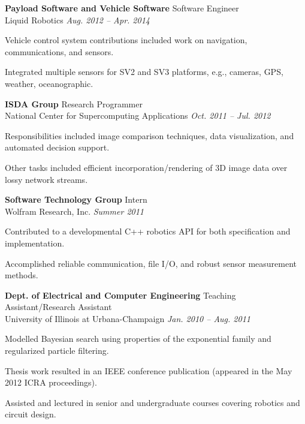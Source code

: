 \documentclass[article]{resume}
\begin{document}
{    \textbf{Payload Software and Vehicle Software} \hfill Software Engineer\\  
    Liquid Robotics \hfill \textsl{Aug. 2012 -- Apr. 2014} \\
    \vspace{ -2 mm}
    \begin{list2}
        \item Vehicle control system contributions included work on navigation, communications, and sensors.
        \item Integrated multiple sensors for SV2 and SV3 platforms, e.g., cameras, GPS, weather, oceanographic.
    \end{list2}\vspace{-2mm}

    \textbf{ISDA Group} \hfill Research Programmer\\  
    National Center for Supercomputing Applications \hfill \textsl{Oct. 2011 -- Jul. 2012} \\
    \vspace{ -2 mm}
    \begin{list2}
        \item Responsibilities included image comparison techniques, data visualization, and automated decision support. 
        \item Other tasks included efficient incorporation/rendering of 3D image data over lossy network streams.  
    \end{list2}\vspace{-2mm}
   
    \textbf{Software Technology Group} \hfill Intern\\  
    Wolfram Research, Inc. \hfill \textsl{Summer 2011} \\
    \vspace{ -2 mm}
    \begin{list2}
        \item Contributed to a developmental C++ robotics API for both specification and implementation.
	 \item Accomplished reliable communication, file I/O, and robust sensor measurement methods. 
    \end{list2}\vspace{-2mm}

    \textbf{Dept. of Electrical and Computer Engineering} \hfill Teaching Assistant/Research Assistant \\  
    University of Illinois at Urbana-Champaign \hfill \textsl{Jan. 2010 -- Aug. 2011} \\
    \vspace{ -2 mm}
    \begin{list2}
        \item Modelled Bayesian search using properties of the exponential family and regularized particle filtering.
	 \item Thesis work resulted in an IEEE conference publication (appeared in the May 2012 ICRA proceedings).  
        \item Assisted and lectured in senior and undergraduate courses covering robotics and circuit design.
    \end{list2}\vspace{-2mm}

}
\end{document}
